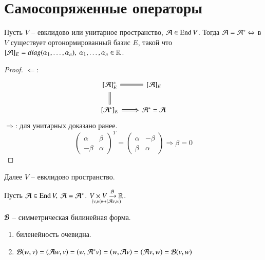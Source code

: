 \documentclass[main]{subfiles}
\begin{document}
\chapter{Самосопряженные операторы}

\begin{proposition}
    Пусть $V$ -- евклидово или унитарное пространство, $\mathcal{A} \in \operatorname{End} V$. Тогда $\mathcal{A} = \mathcal{A}^* \Leftrightarrow$ в $V$ существует ортонормированный базис $E$, такой что
    $[\mathcal{A}]_E = diag(\alpha_1, \ldots, \alpha_n), \  \alpha_1, \ldots, \alpha_n \in \mathbb{R}$.
\end{proposition}

\begin{proof}
    $\Leftarrow$:
    \[\begin{tikzcd}
        {[\mathcal{A}]^*_E} & {[\mathcal{A}]_E} \\
        {[\mathcal{A}^*]_E} & {\mathcal{A}^* = \mathcal{A}}
        \arrow[Rightarrow, no head, from=1-1, to=2-1]
        \arrow[Rightarrow, no head, from=1-1, to=1-2]
        \arrow[Rightarrow, from=2-1, to=2-2]
    \end{tikzcd}\]
    $\Rightarrow$: для унитарных доказано ранее.
    \[\begin{pmatrix}
        \alpha & \beta \\
        -\beta & \alpha
    \end{pmatrix}^T = \begin{pmatrix}
        \alpha & -\beta \\
        \beta & \alpha
    \end{pmatrix} \Rightarrow \beta = 0 \]
\end{proof}


Далее $V$ -- евклидово пространство.

Пусть $\mathcal{A} \in \operatorname{End} V, \ \mathcal{A} = \mathcal{A}^*$. $\underset{(v, w) \mapsto (\mathcal{A} v, w)}{V\times V \xrightarrow{\mathcal{B}} \mathbb{R}}$.

\begin{proposition}
    $\mathcal{B}$ -- симметрическая билинейная форма. 

    \begin{enumerate}
        \item биленейность очевидна.
        \item $\mathcal{B}(w, v) = (\mathcal{A} w, v) = (w, \mathcal{A}^*v) = (w, \mathcal{A} v) = (\mathcal{A} v, w) = \mathcal{B}(v, w)$
    \end{enumerate}
\end{proposition}
\end{document}
